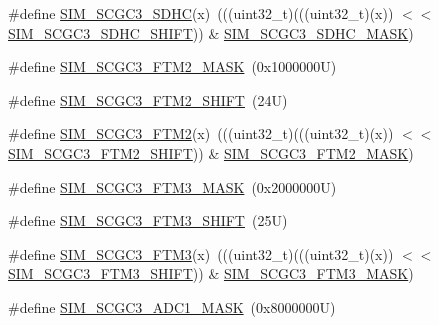 \begin{DoxyCompactItemize}
\item 
\#define \mbox{\hyperlink{group___s_i_m___register___masks_ga1aa1ee181e0ddf6fe978f9de1c68f33f}{S\+I\+M\+\_\+\+S\+C\+G\+C3\+\_\+\+S\+D\+HC}}(x)~(((uint32\+\_\+t)(((uint32\+\_\+t)(x)) $<$$<$ \mbox{\hyperlink{group___s_i_m___register___masks_gab3bd17015713c00477953e717801d5bd}{S\+I\+M\+\_\+\+S\+C\+G\+C3\+\_\+\+S\+D\+H\+C\+\_\+\+S\+H\+I\+FT}})) \& \mbox{\hyperlink{group___s_i_m___register___masks_gac39a09b468d8bb54c31b9b470e53e26b}{S\+I\+M\+\_\+\+S\+C\+G\+C3\+\_\+\+S\+D\+H\+C\+\_\+\+M\+A\+SK}})
\item 
\#define \mbox{\hyperlink{group___s_i_m___register___masks_gafe5009515ab0955d724fa5306171aeeb}{S\+I\+M\+\_\+\+S\+C\+G\+C3\+\_\+\+F\+T\+M2\+\_\+\+M\+A\+SK}}~(0x1000000\+U)
\item 
\#define \mbox{\hyperlink{group___s_i_m___register___masks_gaa31635b220d66ac1a6f8f59b3d64cc6e}{S\+I\+M\+\_\+\+S\+C\+G\+C3\+\_\+\+F\+T\+M2\+\_\+\+S\+H\+I\+FT}}~(24\+U)
\item 
\#define \mbox{\hyperlink{group___s_i_m___register___masks_gaf1cd081e92d746d03f00c8093e653237}{S\+I\+M\+\_\+\+S\+C\+G\+C3\+\_\+\+F\+T\+M2}}(x)~(((uint32\+\_\+t)(((uint32\+\_\+t)(x)) $<$$<$ \mbox{\hyperlink{group___s_i_m___register___masks_gaa31635b220d66ac1a6f8f59b3d64cc6e}{S\+I\+M\+\_\+\+S\+C\+G\+C3\+\_\+\+F\+T\+M2\+\_\+\+S\+H\+I\+FT}})) \& \mbox{\hyperlink{group___s_i_m___register___masks_gafe5009515ab0955d724fa5306171aeeb}{S\+I\+M\+\_\+\+S\+C\+G\+C3\+\_\+\+F\+T\+M2\+\_\+\+M\+A\+SK}})
\item 
\#define \mbox{\hyperlink{group___s_i_m___register___masks_ga5e148c582c15e4caa9bf69c5229562ec}{S\+I\+M\+\_\+\+S\+C\+G\+C3\+\_\+\+F\+T\+M3\+\_\+\+M\+A\+SK}}~(0x2000000\+U)
\item 
\#define \mbox{\hyperlink{group___s_i_m___register___masks_gaf6e5e9833e8a4ff9b18aabe19b7e625b}{S\+I\+M\+\_\+\+S\+C\+G\+C3\+\_\+\+F\+T\+M3\+\_\+\+S\+H\+I\+FT}}~(25\+U)
\item 
\#define \mbox{\hyperlink{group___s_i_m___register___masks_gaaad560403aaa430ac23b6d6eb226f699}{S\+I\+M\+\_\+\+S\+C\+G\+C3\+\_\+\+F\+T\+M3}}(x)~(((uint32\+\_\+t)(((uint32\+\_\+t)(x)) $<$$<$ \mbox{\hyperlink{group___s_i_m___register___masks_gaf6e5e9833e8a4ff9b18aabe19b7e625b}{S\+I\+M\+\_\+\+S\+C\+G\+C3\+\_\+\+F\+T\+M3\+\_\+\+S\+H\+I\+FT}})) \& \mbox{\hyperlink{group___s_i_m___register___masks_ga5e148c582c15e4caa9bf69c5229562ec}{S\+I\+M\+\_\+\+S\+C\+G\+C3\+\_\+\+F\+T\+M3\+\_\+\+M\+A\+SK}})
\item 
\#define \mbox{\hyperlink{group___s_i_m___register___masks_gaf26716d3c8b3d13168bbb2c879e69db1}{S\+I\+M\+\_\+\+S\+C\+G\+C3\+\_\+\+A\+D\+C1\+\_\+\+M\+A\+SK}}~(0x8000000\+U)
$$
\end{DoxyCompactItemize}
